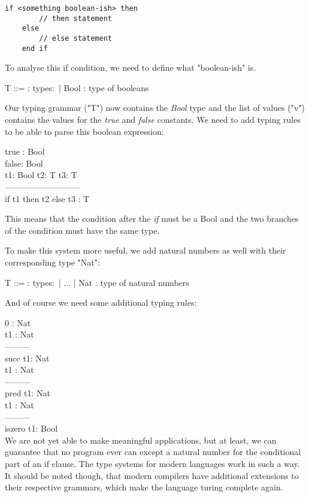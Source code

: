\begin{lstlisting}[caption={If Condition},captionpos=b]
    if <something boolean-ish> then
        // then statement
    else
        // else statement
    end if
\end{lstlisting}

To analyse this if condition, we need to define what
"boolean-ish" is.

\begin{bnfgrammar}
    T ::= : types$\colon$
    | Bool : type of booleans
\end{bnfgrammar}

Our typing grammar ("T") now contains the \textit{Bool} type
and the list of values ("v") contains the values for the
\textit{true} and \textit{false} constants. We need to add
typing rules to be able to parse this boolean expression:

true : Bool\\
false: Bool\\
t1: Bool     t2: T    t3: T\\
---------------------------\\
if t1 then t2 else t3 : T

This means that the condition after the \textit{if} must
be a Bool and the two branches of the condition must have
the same type.

To make this system more useful, we add natural numbers
as well with their corresponding type "Nat":

\begin{bnfgrammar}
    T ::= : types$\colon$
    | ...
    | Nat : type of natural numbers
\end{bnfgrammar}

And of course we need some additional typing rules:

0 : Nat\\
t1 : Nat\\
---------\\
succ t1: Nat\\
t1 : Nat\\
---------\\
pred t1: Nat\\
t1 : Nat\\
---------\\
iszero t1: Bool\\

We are not yet able to make meaningful applications, but
at least, we can guarantee that no program ever can
except a natural number for the conditional part of an if clause.
The type systems for modern languages work in such a way.
It should be noted though, that modern compilers have additional
extensions to their respective grammars, which make the language
turing complete again.

